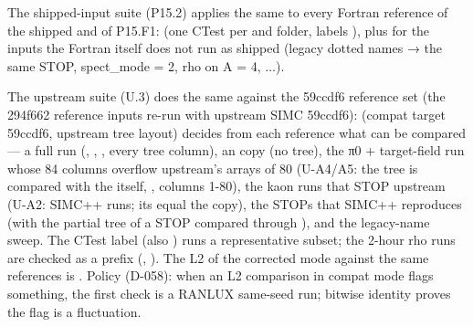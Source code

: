 The shipped-input suite (P15.2) applies the same to every Fortran reference of the shipped  and of P15.F1:
 (one CTest  per 
and  folder, labels ), plus  for the inputs
the Fortran itself does not run as shipped (legacy dotted names → the same STOP, spect\_mode = 2, rho on A = 4, ...).

The upstream suite (U.3) does the same against the 59ccdf6 reference set  (the 294f662 reference
inputs re-run with upstream SIMC 59ccdf6):  (compat target 59ccdf6, upstream
tree layout) decides from each reference what can be compared --- a full run (, , , every tree column),
an  copy (no tree), the π0 + target-field run whose 84 columns overflow upstream's arrays of 80 (U-A4/A5: the
tree is compared with the  itself, , columns 1-80), the kaon  runs that STOP
upstream (U-A2: SIMC++ runs; its  equal the  copy), the STOPs that SIMC++ reproduces (with the
partial tree of a STOP compared through ), and the legacy-name sweep. The CTest label 
(also ) runs a representative subset; the 2-hour rho runs are checked as a prefix (,
). The L2 of the corrected mode against the same references is
.
Policy (D-058): when an L2 comparison in compat mode flags something, the first check is a RANLUX same-seed run;
bitwise identity proves the flag is a fluctuation.

